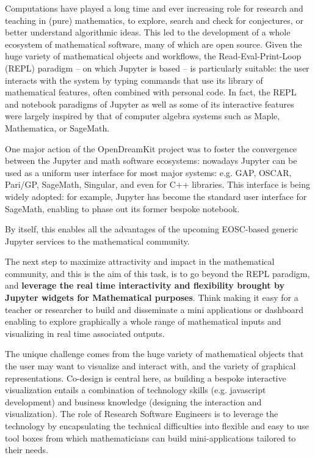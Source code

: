 \begin{task}[
  title=Application: Interactive Mathematics with Jupyter Widgets,
  id=math,
  lead=UPSUD,
  PM=17, %
  wphases={0-36},
  partners={UPSUD,QS}
  ]

  Computations have played a long time and ever increasing role for
  research and teaching in (pure) mathematics, to explore, search and
  check for conjectures, or better understand algorithmic ideas. This
  led to the development of a whole ecosystem of mathematical
  software, many of which are open source. Given the huge variety of
  mathematical objects and workflows, the Read-Eval-Print-Loop (REPL)
  paradigm -- on which Jupyter is based -- is particularly suitable:
  the user interacts with the system by typing commands that use its
  library of mathematical features, often combined with personal code.
  In fact, the REPL and notebook paradigms of Jupyter as well as some
  of its interactive features were largely inspired by that of
  computer algebra systems such as Maple, Mathematica, or SageMath.

  One major action of the OpenDreamKit project was to foster the
  convergence between the Jupyter and math software ecosystems:
  nowadays Jupyter can be used as a uniform user interface for most
  major systems: e.g. GAP, OSCAR, Pari/GP, SageMath, Singular, and
  even for C++ libraries. This interface is being widely adopted: for
  example, Jupyter has become the standard user interface for
  SageMath, enabling to phase out its former bespoke notebook.

  By itself, this enables all the advantages of the upcoming
  EOSC-based generic Jupyter services to the mathematical community.

  The next step to maximize attractivity and impact in the
  mathematical community, and this is the aim of this task, is to go
  beyond the REPL paradigm, and \textbf{leverage the real time
    interactivity and flexibility brought by Jupyter widgets for
    Mathematical purposes}. Think making it easy for a teacher or
  researcher to build and disseminate a mini applications or dashboard
  enabling to explore graphically a whole range of mathematical inputs
  and visualizing in real time associated outputs.

  The unique challenge comes from the huge variety of mathematical
  objects that the user may want to visualize and interact with, and
  the variety of graphical representations. Co-design is central here,
  as building a bespoke interactive visualization entails a
  combination of technology skills (e.g. javascript development) and
  business knowledge (designing the interaction and visualization).
  The role of Research Software Engineers is to leverage the
  technology by encapsulating the technical difficulties into flexible
  and easy to use tool boxes from which mathematicians can build
  mini-applications tailored to their needs.


\end{task}

